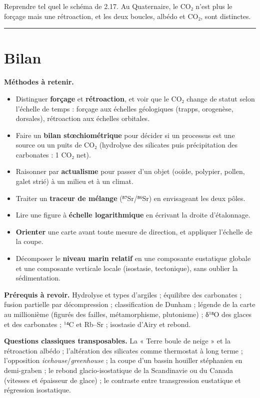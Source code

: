 \documentclass[11pt,a4paper]{article}
\providecommand{\tightlist}{\setlength{\itemsep}{0pt}\setlength{\parskip}{0pt}}
\begin{document}
\begin{piege}

Reprendre tel quel le schéma de 2.17. Au Quaternaire, le CO₂ n'est plus le forçage mais une rétroaction, et les deux boucles, albédo et CO₂, sont distinctes.

\end{piege}

\begin{center}\rule{0.5\linewidth}{0.5pt}\end{center}

\hypertarget{bilan}{%
\section{Bilan}\label{bilan}}

\textbf{Méthodes à retenir.}

\begin{itemize}
\tightlist
\item
  Distinguer \textbf{forçage} et \textbf{rétroaction}, et voir que le CO₂ change de statut selon l'échelle de temps : forçage aux échelles géologiques (trapps, orogenèse, dorsales), rétroaction aux échelles orbitales.
\item
  Faire un \textbf{bilan stœchiométrique} pour décider si un processus est une source ou un puits de CO₂ (hydrolyse des silicates puis précipitation des carbonates : 1 CO₂ net).
\item
  Raisonner par \textbf{actualisme} pour passer d'un objet (ooïde, polypier, pollen, galet strié) à un milieu et à un climat.
\item
  Traiter un \textbf{traceur de mélange} (⁸⁷Sr/⁸⁶Sr) en envisageant les deux pôles.
\item
  Lire une figure à \textbf{échelle logarithmique} en écrivant la droite d'étalonnage.
\item
  \textbf{Orienter} une carte avant toute mesure de direction, et appliquer l'échelle de la coupe.
\item
  Décomposer le \textbf{niveau marin relatif} en une composante eustatique globale et une composante verticale locale (isostasie, tectonique), sans oublier la sédimentation.
\end{itemize}

\textbf{Prérequis à revoir.} Hydrolyse et types d'argiles ; équilibre des carbonates ; fusion partielle par décompression ; classification de Dunham ; légende de la carte au millionième (figurés des failles, métamorphisme, plutonisme) ; δ¹⁸O des glaces et des carbonates ; ¹⁴C et Rb--Sr ; isostasie d'Airy et rebond.

\textbf{Questions classiques transposables.} La « Terre boule de neige » et la rétroaction albédo ; l'altération des silicates comme thermostat à long terme ; l'opposition \emph{icehouse}/\emph{greenhouse} ; la coupe d'un bassin houiller stéphanien en demi-graben ; le rebond glacio-isostatique de la Scandinavie ou du Canada (vitesses et épaisseur de glace) ; le contraste entre transgression eustatique et régression isostatique.
\end{document}
